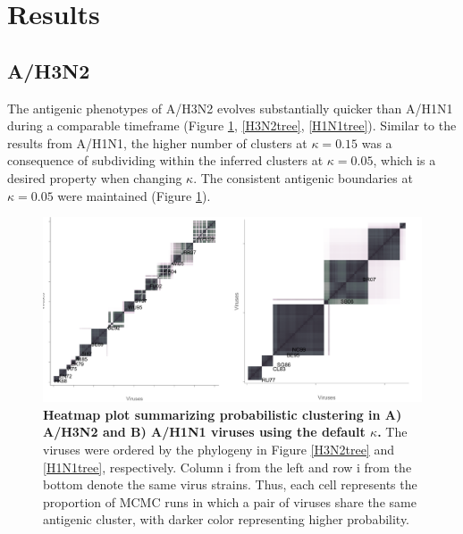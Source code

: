 \documentclass[11pt,oneside,letterpaper]{article}
\begin{document}
\newpage

\section*{Results}

\subsection*{A/H3N2}
The antigenic phenotypes of A/H3N2 evolves substantially quicker than A/H1N1 during a comparable timeframe (Figure \ref{heatmaps}, \ref{H3N2tree}, \ref{H1N1tree}).  %
Similar to the results from A/H1N1, the higher number of clusters at $\kappa=0.15$ was a consequence of subdividing within the inferred clusters at $\kappa=0.05$, which is a desired property when changing $\kappa$.
The consistent antigenic boundaries at $\kappa=0.05$ were maintained (Figure \ref{heatmaps}). 

\begin{figure}[h]
	\centering		
	\includegraphics[width=1\textwidth]{figures/lineArt/combine_h3n2_h1n1_heatmaps}
	\caption{\textbf{Heatmap plot summarizing probabilistic clustering in A) A/H3N2 and B) A/H1N1 viruses using the default $\kappa$.}
The viruses were ordered by the phylogeny in Figure \ref{H3N2tree} and \ref{H1N1tree}, respectively.
Column i from the left and row i from the bottom denote the same virus strains.
Thus, each cell represents the proportion of MCMC runs in which a pair of viruses share the same antigenic cluster, with darker color representing higher probability.  
	 		} 
	\label{heatmaps} 
\end{figure}
\end{document}
